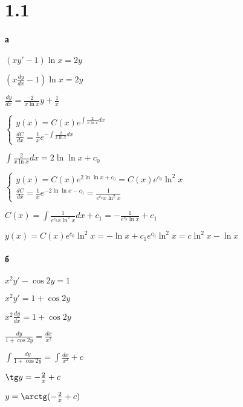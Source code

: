 \documentclass[russian]{article}
\begin{document}
\section*{1.1}

\paragraph*{а}
$(xy' - 1) \ln x = 2y$

$(x \frac{dy}{dx} - 1) \ln x = 2y$

$\frac{dy}{dx} = \frac{2}{x \ln x} y + \frac{1}{x}$

$\begin{cases}
y(x) = C(x) e^{\int \frac{2}{x \ln x} dx} \\
\frac{dC}{dx} = \frac{1}{x} e^{-\int \frac{2}{x \ln x} dx}
\end{cases}$

$\int \frac{2}{x \ln x} dx = 2 \ln \ln x + c_0$

$\begin{cases}
y(x) = C(x) e^{2 \ln \ln x + c_0} = C(x) e^{c_0} \ln ^2 x\\
\frac{dC}{dx} = \frac{1}{x} e^{-2 \ln \ln x - c_0} = \frac{1}{e^{c_0} x \ln ^2 x}
\end{cases}$

$C(x) = \int \frac{1}{e^{c_0} x \ln ^2 x} dx + c_1 = - \frac{1}{e^{c_0} \ln x} + c_1$

$y(x) = C(x) e^{c_0} \ln ^2 x = -\ln x + c_1 e^{c_0} \ln ^2 x = c \ln ^2 x - \ln x$

\paragraph*{б}

$x^2 y' - \cos 2y = 1$

$x^2 y' = 1 + \cos 2y$

$x^2 \frac{dy}{dx} = 1 + \cos 2y$

$\frac{dy}{1 + \cos 2y} = \frac{dx} {x^2}$

$\int \frac{dy}{1 + \cos 2y} = \int \frac{dx} {x^2} + c$

$\tg y = - \frac{2}{x} + c$

$y = \arctg(- \frac{2}{x} + c)$
\end{document}
